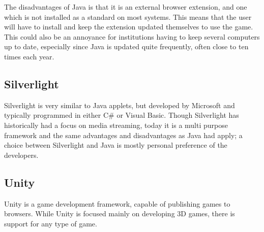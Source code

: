 The disadvantages of Java is that it is an external browser extension, and one which is not installed as a standard on most systems.
This means that the user will have to install and keep the extension updated themselves to use the game. This could also
be an annoyance for institutions having to keep several computers up to date, especially since Java is updated quite frequently, often close to ten times each year.\cite{javahistory13}

\subsection{Silverlight}
Silverlight is very similar to Java applets, but developed by Microsoft and typically programmed in either C\# or Visual Basic.\cite{silverlight13}
Though Silverlight has historically had a focus on media streaming, today it is a multi purpose framework and the same advantages and disadvantages as Java had apply; a choice between Silverlight and Java is mostly personal preference of the developers.

\subsection{Unity}
Unity is a game development framework, capable of publishing games to browsers.\cite{unity13} While Unity is focused mainly on developing 3D games, there is support for any type of game.